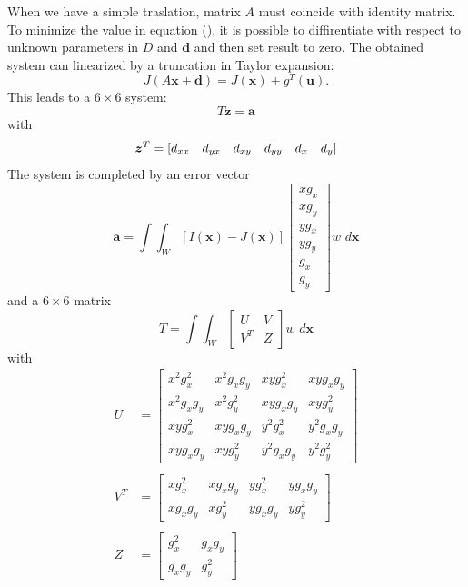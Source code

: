 \documentclass[a4paper, onecolumn]{report}
\begin{document}
When we have a simple traslation, matrix $A$ must coincide with identity matrix. To minimize the value in equation (), it is possible to diffirentiate with respect to unknown parameters in $D$ and $\boldsymbol{d}$ and then set result to zero. The obtained system can linearized by a truncation in Taylor expansion:
\begin{equation}
	J(A\boldsymbol{x} + \boldsymbol{d}) = J(\boldsymbol{x}) + g^T(\boldsymbol{u}).
\end{equation}
This leads to a $6\times6$ system:
\begin{equation}
	T\boldsymbol{z} = \boldsymbol{a}
\end{equation}
with
\begin{equation}
	\boldsymbol{z}^T = \begin{matrix}[d_{xx} & d_{yx} & d_{xy} & d_{yy} & d_x & d_y] \end{matrix}\notag
\end{equation}
The system is completed by an error vector 
\begin{equation}
	\boldsymbol{a} = \int \int_W [I(\boldsymbol{x}) - J(\boldsymbol{x})] \left[\begin{matrix} xg_x \\ xg_y \\ yg_x \\ yg_y \\ g_x \\ g_y  \end{matrix}\right] w \,\, d\boldsymbol{x}
\end{equation}
and a $6\times6$ matrix
\begin{equation}
	T = \int \int_W \left[\begin{matrix}U & V \\ V^T & Z\end{matrix}\right] w \,\, d\boldsymbol{x}
\end{equation}
with 
\begin{equation}
	\begin{aligned}
		U &= \left[\begin{matrix}x^2g_x^2 & x^2g_xg_y & xyg_x^2 & xyg_xg_y \\ x^2g_xg_y & x^2g_y^2 & xyg_xg_y & xyg_y^2 \\ xyg_x^2 & xyg_xg_y & y^2g_x^2 & y^2g_xg_y \\ xyg_xg_y & xyg_y^2 & y^2g_xg_y & y^2g_y^2 \end{matrix}\right] \\ \\
		V^T &= \left[\begin{matrix}xg_x^2 & xg_xg_y & yg_x^2 & yg_xg_y \\ xg_xg_y & xg_y^2 & yg_xg_y & yg_y^2 \end{matrix}\right] \\ \\
		Z &= \left[\begin{matrix}g_x^2 & g_xg_y \\ g_xg_y & g_y^2\end{matrix}\right]
	\end{aligned}
\end{equation}
\end{document}
